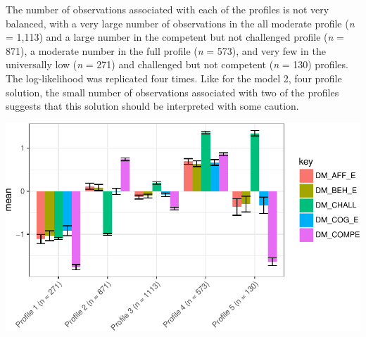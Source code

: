 \documentclass[]{book}
\theoremstyle{definition}
\theoremstyle{definition}
\theoremstyle{definition}
\theoremstyle{remark}
\begin{document}
The number of observations associated with each of the profiles is not
very balanced, with a very large number of observations in the all
moderate profile (\emph{n} = 1,113) and a large number in the competent
but not challenged profile (\emph{n} = 871), a moderate number in the
full profile (\emph{n} = 573), and very few in the universally low
(\emph{n} = 271) and challenged but not competent (\emph{n} = 130)
profiles. The log-likelihood was replicated four times. Like for the
model 2, four profile solution, the small number of observations
associated with two of the profiles suggests that this solution should
be interpreted with some caution.

\begin{center}\includegraphics[width=0.8\linewidth]{rosenberg-dissertation_files/figure-latex/m2_5p-1} \end{center}


\end{document}
